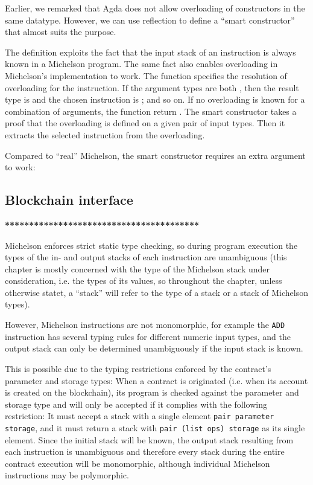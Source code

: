 Earlier, we remarked that Agda does not allow overloading of
constructors in the same datatype. However, we can use reflection to
define a ``smart constructor'' that almost suits the purpose.
\SyntaxOverloading

The definition exploits the fact that the input stack of an
instruction is always known in a Michelson program. The same fact also
enables overloading in Michelson's implementation to work.
The function  specifies the resolution of overloading
for the  instruction. If the argument types are both
, then the result type is  and the chosen instruction is
; and so on. If no  overloading is known for a combination
of arguments, the function return .
The smart constructor  takes a proof that the overloading is
defined on a given pair of input types. Then it extracts the selected
instruction from the overloading.

Compared to ``real'' Michelson, the smart constructor requires an
extra argument to work:
\SyntaxOverloadingExample

\subsection{Blockchain interface}
\label{sec:blockchain-interface}



\textbf{****************************************}

Michelson enforces strict static type checking,
so during program execution the types of the in- and output stacks of each instruction
are unambiguous
(this chapter is mostly concerned with the type of the Michelson stack under consideration,
i.e. the types of its values,
so throughout the chapter, unless otherwise statet, a ``stack'' will refer to
the type of a stack or a stack of Michelson types).

However, Michelson instructions are not monomorphic, for example the \verb=ADD= instruction
has several typing rules for different numeric input types,
and the output stack can only be determined unambiguously if the input stack is known.

This is possible due to the typing restrictions enforced by the contract's parameter and storage
types:
When a contract is originated (i.e. when its account is created on the blockchain),
its program is checked against the parameter and storage type and will only be accepted
if it complies with the following restriction:
It must accept a stack with a single element \verb/pair parameter storage/,
and it must return a stack with \verb/pair (list ops) storage/ as its single element.
Since the initial stack will be known, the output stack resulting from each instruction
is unambiguous and therefore every stack during the entire contract execution will be monomorphic,
although individual Michelson instructions may be polymorphic.

